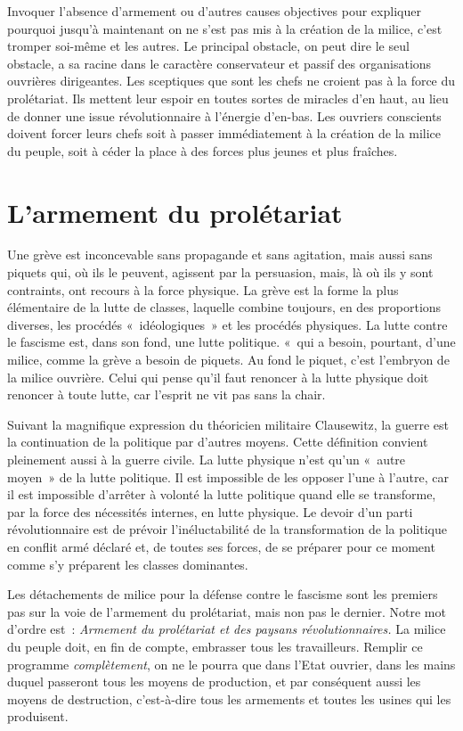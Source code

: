 \documentclass[french,twoside]{book} %
\begin{document}
Invoquer l’absence d’armement ou d’autres causes objectives pour expliquer pourquoi jusqu’à maintenant on ne s’est pas mis à la création de la milice, c’est tromper soi-même et les autres. Le principal obstacle, on peut dire le seul obstacle, a sa racine dans le caractère conservateur et passif des organisations ouvrières dirigeantes. Les sceptiques que sont les chefs ne croient pas à la force du prolétariat. Ils mettent leur espoir en toutes sortes de miracles d’en haut, au lieu de donner une issue révolutionnaire à l’énergie d’en-bas. Les ouvriers conscients doivent forcer leurs chefs soit à passer immédiatement à la création de la milice du peuple, soit à céder la place à des forces plus jeunes et plus fraîches.
\section[{L’armement du prolétariat}]{L’armement du prolétariat}
\noindent Une grève est inconcevable sans propagande et sans agitation, mais aussi sans piquets qui, où ils le peuvent, agissent par la persuasion, mais, là où ils y sont contraints, ont recours à la force physique. La grève est la forme la plus élémentaire de la lutte de classes, laquelle combine toujours, en des proportions diverses, les procédés « idéologiques » et les procédés physiques. La lutte contre le fascisme est, dans son fond, une lutte politique.  « qui a besoin, pourtant, d’une milice, comme la grève a besoin de piquets. Au fond le piquet, c’est l’embryon de la milice ouvrière. Celui qui pense qu’il faut renoncer à la lutte physique doit renoncer à toute lutte, car l’esprit ne vit pas sans la chair.\par
Suivant la magnifique expression du théoricien militaire Clausewitz, la guerre est la continuation de la politique par d’autres moyens. Cette définition convient pleinement aussi à la guerre civile. La lutte physique n’est qu’un « autre moyen » de la lutte politique. Il est impossible de les opposer l’une à l’autre, car il est impossible d’arrêter à volonté la lutte politique quand elle se transforme, par la force des nécessités internes, en lutte physique. Le devoir d’un parti révolutionnaire est de prévoir l’inéluctabilité de la transformation de la politique en conflit armé déclaré et, de toutes ses forces, de se préparer pour ce moment comme s’y préparent les classes dominantes.\par
Les détachements de milice pour la défense contre le fascisme sont les premiers pas sur la voie de l’armement du prolétariat, mais non pas le dernier. Notre mot d’ordre est : \emph{Armement du prolétariat et des paysans révolutionnaires.} La milice du peuple doit, en fin de compte, embrasser tous les travailleurs. Remplir ce programme \emph{complètement}, on ne le pourra que dans l’Etat ouvrier, dans les mains duquel passeront tous les moyens de production, et par conséquent aussi les moyens de destruction, c’est-à-dire tous les armements et toutes les usines qui les produisent.\par
\end{document}
